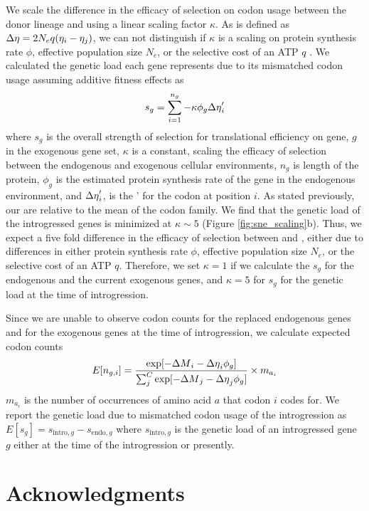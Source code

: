 \documentclass[fleqn,letterpaper]{article}
\begin{document}
We scale the difference in the efficacy of selection on codon usage between the donor lineage and \kluyveri using a linear scaling factor $\kappa$.
As \DE is defined as ${\Delta \eta} = 2N_eq(\eta_i-\eta_j)$, we can not distinguish if $\kappa$ is a scaling on protein synthesis rate $\phi$, effective population size $N_e$, or the selective cost of an ATP $q$ \citep{gilchrist2007, gilchrist2015}.
We calculated the genetic load each gene represents due to its mismatched codon usage assuming additive fitness effects as 
\begin{equation}
s_g = \sum_{i=1}^{n_g} -\kappa \phi_g {\Delta \eta}'_i 
\end{equation}
where $s_g$ is the overall strength of selection for translational efficiency on gene, $g$  in the exogenous gene set, $\kappa$ is a constant, scaling the efficacy of selection between the endogenous and exogenous cellular environments, $n_{g}$ is length of the protein, $\phi_g$ is the estimated protein synthesis rate of the gene in the endogenous environment, and ${\Delta \eta}'_i$, is the \DE' for the codon at position $i$.
As stated previously, our \DE are relative to the mean of the codon family.
We find that the genetic load of the introgressed genes is minimized at $\kappa \sim 5$ (Figure \ref{fig:sne_scaling}b).
Thus, we expect a five fold difference in the efficacy of selection between \kluyveri and \gossypii, either due to differences in either protein synthesis rate $\phi$, effective population size $N_e$, or the selective cost of an ATP $q$.
Therefore, we set $\kappa = 1$ if we calculate the $s_g$ for the endogenous and the current exogenous genes, and $\kappa = 5$ for $s_g$ for the genetic load at the time of introgression.

Since we are unable to observe codon counts for the replaced endogenous genes and for the exogenous genes at the time of introgression, we calculate expected codon counts
\begin{equation}
E[n_{g,i}] = \frac{\exp[-{\Delta M}_i -{\Delta \eta}_i\phi_g]}{\sum_j^C \exp[-{\Delta M}_j -{\Delta \eta}_j\phi_g]}\times m_{a_i}
\end{equation} 
$m_{a_i}$ is the number of occurrences of amino acid $a$ that codon $i$ codes for.
We report the genetic load due to mismatched codon usage of the introgression as $E[s_g] = s_{\text{intro},g} - s_{\text{endo},g}$ where $s_{\text{intro},g}$ is the genetic load of an introgressed gene $g$ either at the time of the introgression or presently.

\section*{Acknowledgments}
\end{document}

